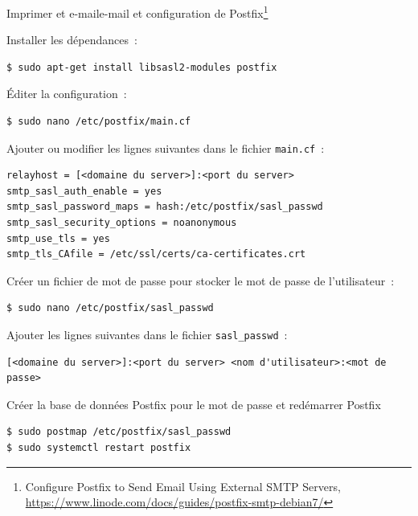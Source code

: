 \documentclass{beamer}
\begin{document}
    \begin{frame}[fragile]{Imprimer et e-mail}{e-mail et configuration de Postfix\footnote{Configure Postfix to Send Email Using External SMTP Servers, \url{https://www.linode.com/docs/guides/postfix-smtp-debian7/}}}
        \begin{tiny}
            Installer les dépendances~:
            \begin{lstlisting}[language=bash,basicstyle=\tiny\ttfamily]
$ sudo apt-get install libsasl2-modules postfix
            \end{lstlisting}
            Éditer la configuration~:
            \begin{lstlisting}[language=bash,basicstyle=\tiny\ttfamily]
$ sudo nano /etc/postfix/main.cf
            \end{lstlisting}
            Ajouter ou modifier les lignes suivantes dans le fichier \lstinline{main.cf}~:
            \begin{lstlisting}[basicstyle=\tiny\ttfamily]
relayhost = [<domaine du server>]:<port du server>
smtp_sasl_auth_enable = yes
smtp_sasl_password_maps = hash:/etc/postfix/sasl_passwd
smtp_sasl_security_options = noanonymous
smtp_use_tls = yes
smtp_tls_CAfile = /etc/ssl/certs/ca-certificates.crt
            \end{lstlisting}
            Créer un fichier de mot de passe pour stocker le mot de passe de l'utilisateur~:
            \begin{lstlisting}[language=bash,basicstyle=\tiny\ttfamily]
$ sudo nano /etc/postfix/sasl_passwd
            \end{lstlisting}
            Ajouter les lignes suivantes dans le fichier \lstinline{sasl_passwd}~:
            \begin{lstlisting}[basicstyle=\tiny\ttfamily]
[<domaine du server>]:<port du server> <nom d'utilisateur>:<mot de passe>
            \end{lstlisting}
            Créer la base de données Postfix pour le mot de passe et redémarrer Postfix
            \begin{lstlisting}[language=bash,basicstyle=\tiny\ttfamily]
$ sudo postmap /etc/postfix/sasl_passwd
$ sudo systemctl restart postfix
            \end{lstlisting}
        \end{tiny}
    \end{frame}
\end{document}
